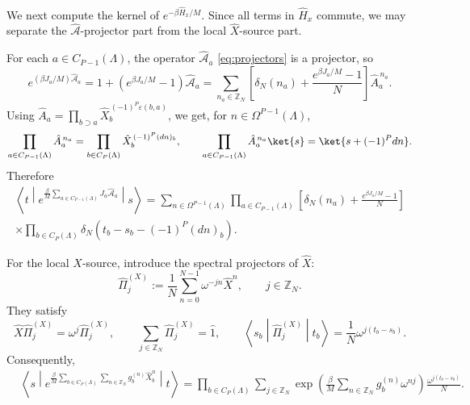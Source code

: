 \documentclass[dvipsnames,a4paper]{article}
\numberwithin{equation}{section}
\theoremstyle{definition}
\theoremstyle{remark}
\newcommand{\matrixel}[3]{\left\langle #1 \middle| #2 \middle| #3 \right\rangle}
\begin{document}
We next compute the kernel of \(e^{-\beta\hat H_x/M}\). Since all terms in \(\hat H_x\)
commute, we may separate the \(\hat{\mathcal A}\)-projector part from the local
\(\hat X\)-source part.

For each \(a\in C_{P-1}(\Lambda)\), the operator \(\hat{\mathcal A}_a\) \eqref{eq:projectors} is a projector, so
\begin{equation}
	e^{(\beta J_a/M)\hat{\mathcal A}_a}
	=
	1+\left(e^{\beta J_a/M}-1\right)\hat{\mathcal A}_a
	=
	\sum_{n_a\in\mathbb Z_N}
	\left[
	\delta_N(n_a)+\frac{e^{\beta J_a/M}-1}{N}
	\right]
	\hat A_a^{\,n_a}.
	\label{eq:projector-exp-sum}
\end{equation}
Using $\hat A_a=\prod_{b\supset a}\hat X_b^{\,(-1)^P\varepsilon(b,a)}$,
we get, for \(n\in\Omega^{P-1}(\Lambda)\),
\begin{equation}
	\prod_{a\in C_{P-1}(\Lambda)}\hat A_a^{\,n_a}
	=
	\prod_{b\in C_P(\Lambda)}
	\hat X_b^{\,(-1)^P(dn)_b},
	\qquad
	\prod_{a\in C_{P-1}(\Lambda)}\hat A_a^{\,n_a}\ket{s}
	=
	\ket{s+(-1)^Pdn}.
	\label{eq:A-product-dn}
\end{equation}
Therefore
\begin{equation}
	\begin{aligned}
		\matrixel{t}{
			e^{\frac{\beta}{M}\sum_{a\in C_{P-1}(\Lambda)}J_a\hat{\mathcal A}_a}
		}{s}
		=
		\sum_{n\in\Omega^{P-1}(\Lambda)}
		\prod_{a\in C_{P-1}(\Lambda)}
		\left[
		\delta_N(n_a)+\frac{e^{\beta J_a/M}-1}{N}
		\right]
		\\
		\times
		\prod_{b\in C_P(\Lambda)}
		\delta_N\left(t_b-s_b-(-1)^P(dn)_b\right).
	\end{aligned}
	\label{eq:HA-kernel}
\end{equation}

For the local \(X\)-source, introduce the spectral projectors of \(\hat X\):
\begin{equation}
	\hat\Pi_j^{(X)}
	:=
	\frac1N\sum_{n=0}^{N-1}\omega^{-jn}\hat X^n,
	\qquad
	j\in\mathbb Z_N.
	\label{eq:X-projectors}
\end{equation}
They satisfy
\begin{equation}
	\hat X\hat\Pi_j^{(X)}=\omega^j\hat\Pi_j^{(X)},
	\qquad
	\sum_{j\in\mathbb Z_N}\hat\Pi_j^{(X)}=\hat 1,
	\qquad
	\matrixel{s_b}{\hat\Pi_j^{(X)}}{t_b}
	=
	\frac1N\omega^{j(t_b-s_b)}.
	\label{eq:PiX-proj}
\end{equation}
Consequently,
\begin{align}
	&\matrixel{s}{
		e^{\frac{\beta}{M}\sum_{b\in C_P(\Lambda)}
			\sum_{n\in\mathbb Z_N}g_b^{(n)}\hat X_b^n}
	}{t}
	=
	\prod_{b\in C_P(\Lambda)}
	\sum_{j\in\mathbb Z_N}
	\exp\left(
	\frac{\beta}{M}\sum_{n\in\mathbb Z_N}g_b^{(n)}\omega^{nj}
	\right)
	\frac{\omega^{j(t_b-s_b)}}{N}.
	\label{eq:HXsource-kernel}
\end{align}
\end{document}
